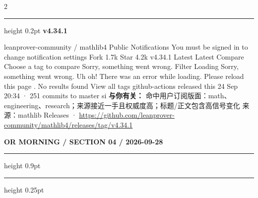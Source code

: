 \documentclass[10.5pt]{ctexart}
\begin{document}
\begin{multicols}{2}
\vspace{2mm}
\hrule height 0.2pt
\vspace{2mm}
{\large\bfseries v4.34.1}\par
leanprover-community / mathlib4 Public Notifications You must be signed in to change notification settings Fork 1.7k Star 4.2k v4.34.1 Latest Latest Compare Choose a tag to compare Sorry, something went wrong. Filter Loading Sorry, something went wrong. Uh oh! There was an error while loading. Please reload this page . No results found View all tags github-actions released this 24 Sep 20:34 · 251 commits to master si
\textbf{与你有关：} 命中用户订阅版面：math、engineering、research；来源接近一手且权威度高；标题/正文包含高信号变化
{\footnotesize\color{ormuted} 来源：mathlib Releases · \url{https://github.com/leanprover-community/mathlib4/releases/tag/v4.34.1}}
\end{multicols}
\newpage
{\small\bfseries OR MORNING / SECTION 04 / 2026-09-28}
\vspace{2mm}
\hrule height 0.9pt
\vspace{1.5mm}
\hrule height 0.25pt
\vspace{4mm}
\end{document}
